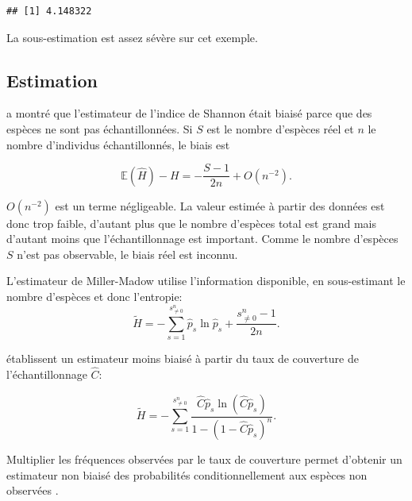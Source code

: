 \documentclass[
  11pt,
  french,
  a4paper,
  extrafontsizes,onecolumn,openright
  ]{memoir}
\begin{document}
\begin{verbatim}
## [1] 4.148322
\end{verbatim}

\normalsize

La sous-estimation est assez sévère sur cet exemple.

\hypertarget{sec-BiaisShannon}{%
\subsection{Estimation}\label{sec-BiaisShannon}}

\textcite{Basharin1959} a montré que l'estimateur de l'indice de Shannon était biaisé parce que des espèces ne sont pas échantillonnées.
Si \(S\) est le nombre d'espèces réel et \(n\) le nombre d'individus échantillonnés, le biais est

\begin{equation}
  \label{eq:Basharin1959}
  \mathbb{E}\left(\hat{H}\right)-H =-\frac{S-1}{2n} + O\left(n^{-2}\right).
\end{equation}

\(O\left(n^{-2}\right)\) est un terme négligeable.
La valeur estimée à partir des données est donc trop faible, d'autant plus que le nombre d'espèces total est grand mais d'autant moins que l'échantillonnage est important.
Comme le nombre d'espèces \(S\) n'est pas observable, le biais réel est inconnu.

L'estimateur de Miller-Madow \autocite{Miller1955} utilise l'information disponible, en sous-estimant le nombre d'espèces et donc l'entropie:
\begin{equation}
  \label{eq:MillerMadow}
  \tilde{H} = -\sum^{s^{n}_{\ne 0}}_{s=1}{\hat{p}_s \ln{\hat{p}_s}} + \frac{s^{n}_{\ne 0}-1}{2n}.
\end{equation}

\textcite{Chao2003} établissent un estimateur moins biaisé à partir du taux de couverture de l'échantillonnage \(\hat{C}\):

\begin{equation}
  \label{eq:ChaoShen}
  \tilde{H} = -\sum_{s=1}^{s^{n}_{\ne 0}}{\frac{\hat{C}{\hat{p}}_s \ln\left(\hat{C}{\hat{p}}_s\right)}{1-\left(1-\hat{C}{\hat{p}}_s\right)^n}}.
\end{equation}

Multiplier les fréquences observées par le taux de couverture permet d'obtenir un estimateur non biaisé des probabilités conditionnellement aux espèces non observées \autocite{Ashbridge2000}.
\end{document}
